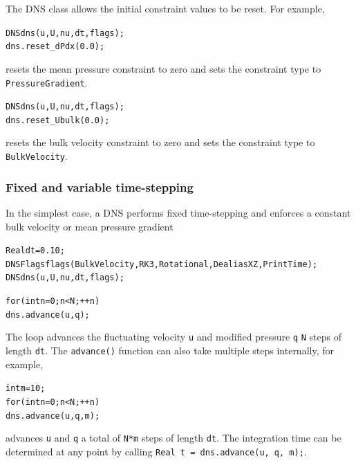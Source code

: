 \documentclass{article}[12pt]
\begin{document}
The DNS class allows the initial constraint values to be reset. For example,
\begin{alltt}
  DNS dns(u,U,nu,dt,flags);
  dns.reset\_dPdx(0.0);
\end{alltt}
resets the mean pressure constraint to zero and sets the constraint type
to {\tt PressureGradient}.
\begin{alltt}
  DNS dns(u,U,nu,dt,flags);
  dns.reset\_Ubulk(0.0);
\end{alltt}
resets the bulk velocity constraint to zero and sets the constraint type
to {\tt BulkVelocity}.

\subsubsection{Fixed and variable time-stepping}
\label{sec:fixed_variable_timestepping}


In the simplest case, a DNS performs fixed time-stepping and
enforces a constant bulk velocity or mean pressure gradient
\begin{alltt}
   Real dt=0.10;
   DNSFlags flags(BulkVelocity, RK3, Rotational, DealiasXZ, PrintTime);
   DNS dns(u, U, nu, dt, flags);

   for (int n=0; n<N; ++n)
      dns.advance(u, q);
\end{alltt}
The loop advances the fluctuating velocity {\tt u} and modified pressure
{\tt q} {\tt N} steps of length {\tt dt}. The {\tt advance()} function
can also take multiple steps internally, for example,
\begin{alltt}
   int m = 10;
   for (int n=0; n<N; ++n)
      dns.advance(u, q, m);
\end{alltt}
advances {\tt u} and {\tt q} a total of {\tt N*m} steps of length {\tt dt}.
The integration time can be determined at any point by calling
{\tt Real t = dns.advance(u, q, m);}.

\end{document}
